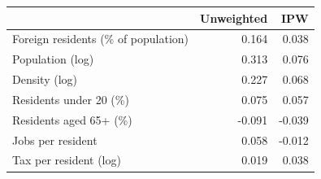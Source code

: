 \begin{tabular}{lrr}
\toprule
 & Unweighted & IPW \\
\midrule
Foreign residents (\% of population) & 0.164 & 0.038 \\
Population (log) & 0.313 & 0.076 \\
Density (log) & 0.227 & 0.068 \\
Residents under 20 (\%) & 0.075 & 0.057 \\
Residents aged 65+ (\%) & -0.091 & -0.039 \\
Jobs per resident & 0.058 & -0.012 \\
Tax per resident (log) & 0.019 & 0.038 \\
\bottomrule
\end{tabular}
